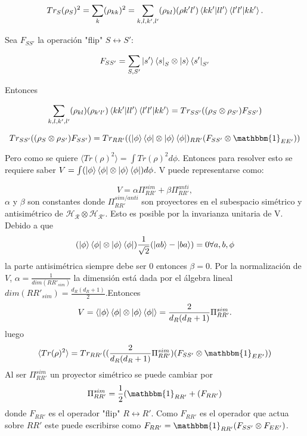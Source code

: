 \begin{equation}
Tr_{S} (\rho_{S})^2 = \sum_{k} (\rho_{kk})^{2} = \sum_{k,l,k',l'}(\rho_{kl})(\rho{k'l'}) \bra{kk'}\ket{ll'}\bra{l'l'}\ket{kk'}.
\end{equation}

Sea $F_{SS'}$ la operación "flip" $S \longleftrightarrow S'$:

\begin{equation}
F_{SS'} =\sum_{S,S'} \ket{s'}\bra{s}_{S} \otimes \ket{s}\bra{s'}_{S'}
\end{equation}

Entonces

\begin{equation} \label{eq:1}
\sum_{k,l,k',l'}(\rho_{kl})(\rho_{k'l'}) \bra{kk'}\ket{ll'}\bra{l'l'}\ket{kk'}= Tr_{SS'} ((\rho_{S} \otimes \rho_{S'})F_{SS'})
\end{equation}

\begin{equation}
Tr_{SS'} ((\rho_{S} \otimes \rho_{S'})F_{SS'})=Tr_{RR'}((\ket{\phi} \bra{\phi} \otimes \ket{\phi} \bra{\phi})_{RR'}(F_{SS'} \otimes \mathbbm{1}_{EE'}))
\end{equation}

Pero como se quiere $\langle Tr (\rho)^{2} \rangle= \int Tr (\rho)^{2} d\phi $. Entonces para resolver esto se requiere saber $V=\int (\ket{\phi} \bra{\phi} \otimes \ket{\phi} \bra{\phi})d\phi$. V puede representarse como:

\begin{equation}
V= \alpha \Pi_{RR'}^{sim} + \beta \Pi_{RR'}^{anti},
\end{equation}
$\alpha$ y $\beta$ son constantes donde $\Pi_{RR'}^{sim/anti}$ son proyectores en el subespacio simétrico y antisimétrico de $\mathcal{H_{R} \otimes H_{R'}}$. Esto es posible por la invarianza unitaria de V. Debido a que 
\begin{equation}
(\ket{\phi} \bra{\phi} \otimes \ket{\phi} \bra{\phi})\frac{1}{\sqrt{2}} ( \ket{ab} -\ket{ba})=0  \forall a,b,\phi
\end{equation}
la parte antisimétrica siempre debe ser 0 entonces $\beta=0$. Por la normalización de $V$, $\alpha= \frac{1}{dim(RR'_{sim})}$ la dimensión está dada por el álgebra lineal $dim(RR'_{sim})= \frac{d_{R}(d_{R}+1)}{2}$.Entonces
\begin{equation}
V= \langle \ket{\phi} \bra{\phi} \otimes \ket{\phi} \bra{\phi} \rangle = \frac{2}{d_{R}(d_{R} +1)} \Pi_{RR'}^{sim}.
\end{equation}
luego 
\begin{equation}
\langle Tr (\rho)^{2} \rangle = Tr_{RR'}((\frac{2}{d_{R}(d_{R} +1)} \Pi_{RR'}^{sim})(F_{SS'} \otimes \mathbbm{1}_{EE'}))
\end{equation}
Al ser $\Pi_{RR'}^{sim}$ un proyector simétrico se puede cambiar por 
\begin{equation}
\Pi_{RR'}^{sim}=\frac{1}{2}(\mathbbm{1}_{RR'}+(F_{RR'} )
\end{equation}
donde $F_{RR'}$ es el operador "flip" $R \longleftrightarrow R'$. Como $F_{RR'}$ es el operador que actua sobre $RR'$ este puede escribirse como $F_{RR'}= \mathbbm{1}_{RR'}(F_{SS'} \otimes F_{EE'})$.

